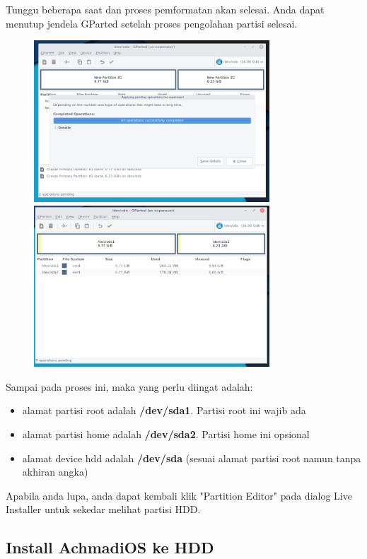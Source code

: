 \documentclass[12pt,]{article}
\begin{document}
	Tunggu beberapa saat dan proses pemformatan akan selesai.
	Anda dapat menutup jendela GParted setelah proses pengolahan partisi selesai.
	
	\begin{figure}[!ht]
		\centering
		\includegraphics[width=250pt]{installhdd/step_14}
		\includegraphics[width=250pt]{installhdd/step_15}
	\end{figure}
	
	Sampai pada proses ini, maka yang perlu diingat adalah:
	\begin{itemize}
		\item alamat partisi root adalah \textbf{/dev/sda1}. Partisi root ini wajib ada
		\item alamat partisi home adalah \textbf{/dev/sda2}. Partisi home ini opsional
		\item alamat device hdd adalah \textbf{/dev/sda} (sesuai alamat partisi root namun tanpa akhiran angka)
	\end{itemize}

	Apabila anda lupa, anda dapat kembali klik "Partition Editor" pada dialog Live Installer untuk sekedar melihat partisi HDD.
	
	\newpage
	\subsection{Install AchmadiOS ke HDD}
	
\end{document}
